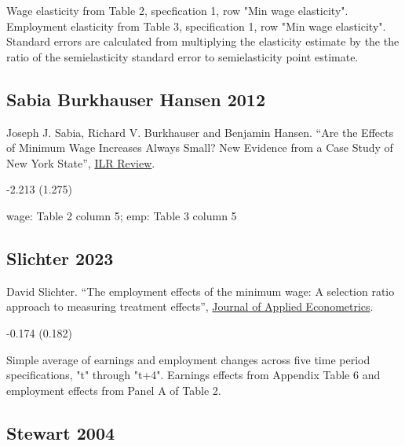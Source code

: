  Wage elasticity from Table 2, specfication 1, row "Min wage elasticity". Employment elasticity from Table 3, specification 1, row "Min wage elasticity". Standard errors are calculated from multiplying the elasticity estimate by the the ratio of the semielasticity standard error to semielasticity point estimate.

\subsection*{Sabia Burkhauser Hansen 2012}
\vspace{-0.7em}

\noindent Joseph J. Sabia, Richard V. Burkhauser and Benjamin Hansen. ``Are the Effects of Minimum Wage Increases Always Small? New Evidence from a Case Study of New York State'', \href{https://doi.org/10.1177/001979391206500207}{ILR Review}.

\vspace{0.7em}

 -2.213 (1.275)

\vspace{0.7em}

 wage: Table 2 column 5; emp: Table 3 column 5

\subsection*{Slichter 2023}
\vspace{-0.7em}

\noindent David Slichter. ``The employment effects of the minimum wage: A selection ratio approach to measuring treatment effects'', \href{https://doi.org/10.1002/jae.2954}{Journal of Applied Econometrics}.

\vspace{0.7em}

 -0.174 (0.182)

\vspace{0.7em}

 Simple average of earnings and employment changes across five time period specifications, "t" through "t+4". Earnings effects from Appendix Table 6 and employment effects from Panel A of Table 2.

\subsection*{Stewart 2004}
\vspace{-0.7em}

